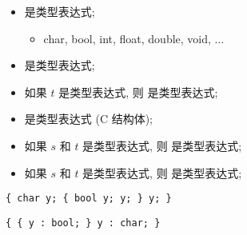 \begin{frame}{}
  \begin{center}
    \begin{definition}
      \begin{itemize}
        \setlength{\itemsep}{12pt}
        \item {}是类型表达式;
          \begin{itemize}
            \item char, bool, int, float, double, void, $\dots$
          \end{itemize}
        \item {}是类型表达式;
        \pause
        \item 如果 $t$ 是类型表达式, 则  是类型表达式;
        \item {} 是类型表达式 (C 结构体);
        \pause
        \item 如果 $s$ 和 $t$ 是类型表达式, 则  是类型表达式;
        \item 如果 $s$ 和 $t$ 是类型表达式, 则  是类型表达式;
      \end{itemize}
    \end{definition}
  \end{center}
\end{frame}

\begin{frame}{}
  \begin{center}
  \end{center}
\end{frame}

\begin{frame}{}
  \begin{center}
    \texttt{\{ char y; \{ bool y; y; \} y; \}}

    \vspace{0.80cm}
    \texttt{\{ \{ y : bool; \} y : char; \}}
  \end{center}
\end{frame}

\begin{frame}{}
  \begin{center}
  \end{center}
\end{frame}

